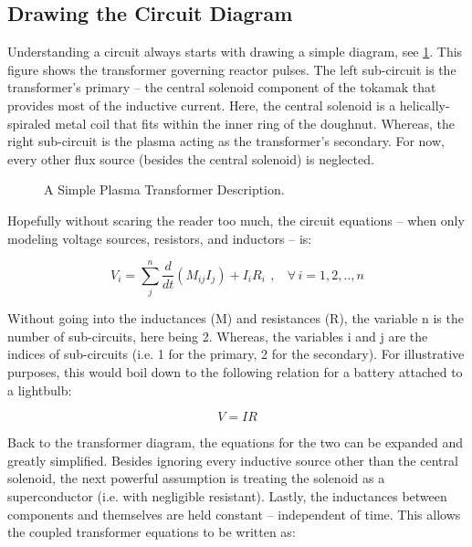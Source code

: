 \subsection{Drawing the Circuit Diagram}

Understanding a circuit always starts with drawing a simple diagram, see \cref{fig:circuit_diagram}. This figure shows the transformer governing reactor pulses. The left sub-circuit is the transformer's primary -- the central solenoid component of the tokamak that provides most of the inductive current. Here, the central solenoid is a helically-spiraled metal coil that fits within the inner ring of the doughnut. Whereas, the right sub-circuit is the plasma acting as the transformer's secondary. For now, every other flux source (besides the central solenoid) is neglected.

\begin{figure}[h!]
\centering

\caption{A Simple Plasma Transformer Description.}
\label{fig:circuit_diagram}
\end{figure}

Hopefully without scaring the reader too much, the circuit equations -- when only modeling voltage sources, resistors, and inductors -- is:

\begin{equation}
	V_i = \sum_j^n \frac{d}{dt} \left( M_{ij} I_j \right) + I_i R_i \ \, , \ \ \ \ \forall \, i = 1,2,..,n
\end{equation}

Without going into the inductances (M) and resistances (R), the variable n is the number of sub-circuits, here being 2. Whereas, the variables i and j are the indices of sub-circuits (i.e. 1 for the primary, 2 for the secondary). For illustrative purposes, this would boil down to the following relation for a battery attached to a lightbulb:

\begin{equation}
	V = I R
\end{equation}

Back to the transformer diagram, the equations for the two can be expanded and greatly simplified. Besides ignoring every inductive source other than the central solenoid, the next powerful assumption is treating the solenoid as a superconductor (i.e. with negligible resistant). Lastly, the inductances between components and themselves are held constant -- independent of time. This allows the coupled transformer equations to be written as:

